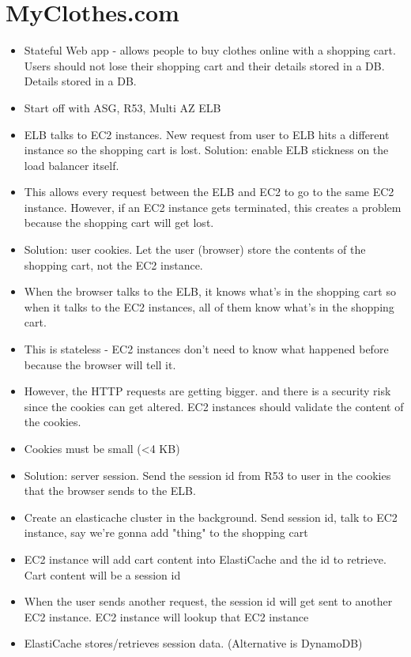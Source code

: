 \documentclass[]{scrartcl}
\begin{document}
\section{MyClothes.com}
\begin{itemize}
	\item Stateful Web app - allows people to buy clothes online with a shopping cart. Users should not lose their shopping cart and their details stored in a DB. Details stored in a DB. 
	\item Start off with ASG, R53, Multi AZ ELB
	\item ELB talks to EC2 instances. New request from user to ELB hits a different instance so the shopping cart is lost. Solution: enable ELB stickness on the load balancer itself. 
	\item This allows every request between the ELB and EC2 to go to the same EC2 instance. However, if an EC2 instance gets terminated, this creates a problem because the shopping cart will get lost. 
	\item Solution: user cookies. Let the user (browser) store the contents of the shopping cart, not the EC2 instance. 
	\item When the browser talks to the ELB, it knows what's in the shopping cart so when it talks to the EC2 instances, all of them know what's in the shopping cart. 
	\item This is stateless - EC2 instances don't need to know what happened before because the browser will tell it. 
	\item However, the HTTP requests are getting bigger. and there is a security risk since the cookies can get altered. EC2 instances should validate the content of the cookies. 
	\item Cookies must be small (<4 KB)
	\item Solution: server session. Send the session id from R53 to user in the cookies that the browser sends to the ELB. 
	\item Create an elasticache cluster in the background. Send session id, talk to EC2 instance, say we're gonna add "thing" to the shopping cart
	\item EC2 instance will add cart content into ElastiCache and the id to retrieve. Cart content will be a session id
	\item When the user sends another request, the session id will get sent to another EC2 instance. EC2 instance will lookup that EC2 instance
	\item ElastiCache stores/retrieves session data. (Alternative is DynamoDB)

\end{itemize}
\end{document}
